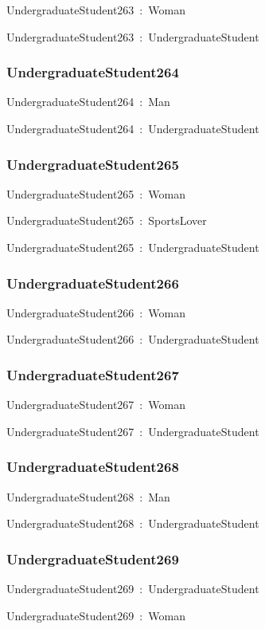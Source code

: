 \documentclass{article}
\begin{document}
UndergraduateStudent263~:~Woman

UndergraduateStudent263~:~UndergraduateStudent

\subsubsection*{UndergraduateStudent264}

UndergraduateStudent264~:~Man

UndergraduateStudent264~:~UndergraduateStudent

\subsubsection*{UndergraduateStudent265}

UndergraduateStudent265~:~Woman

UndergraduateStudent265~:~SportsLover

UndergraduateStudent265~:~UndergraduateStudent

\subsubsection*{UndergraduateStudent266}

UndergraduateStudent266~:~Woman

UndergraduateStudent266~:~UndergraduateStudent

\subsubsection*{UndergraduateStudent267}

UndergraduateStudent267~:~Woman

UndergraduateStudent267~:~UndergraduateStudent

\subsubsection*{UndergraduateStudent268}

UndergraduateStudent268~:~Man

UndergraduateStudent268~:~UndergraduateStudent

\subsubsection*{UndergraduateStudent269}

UndergraduateStudent269~:~UndergraduateStudent

UndergraduateStudent269~:~Woman
\end{document}
